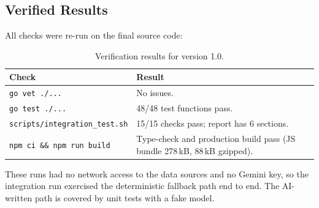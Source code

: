 \documentclass[12pt,a4paper,oneside]{report}
\begin{document}
\subsection{Verified Results}
All checks were re-run on the final source code:
\begin{table}[H]\centering\small
\begin{tabularx}{\textwidth}{>{\raggedright\arraybackslash}p{5.2cm}X}
\toprule \textbf{Check} & \textbf{Result}\\\midrule
\texttt{go vet ./...} & No issues.\\
\texttt{go test ./...} & 48/48 test functions pass.\\
\texttt{scripts/integration\_test.sh} & 15/15 checks pass; report has 6 sections.\\
\texttt{npm ci \&\& npm run build} & Type-check and production build pass (JS bundle 278\,kB, 88\,kB gzipped).\\
\bottomrule
\end{tabularx}
\caption{Verification results for version 1.0.}
\label{tab:verify}
\end{table}
These runs had no network access to the data sources and no Gemini key, so the integration run exercised the deterministic fallback path end to end. The AI-written path is covered by unit tests with a fake model.
\end{document}
